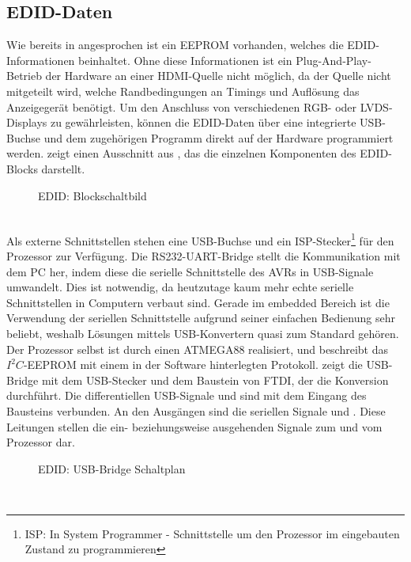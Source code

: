 \subsection{EDID-Daten}
\label{cha:sw_edid_daten}
Wie bereits in  angesprochen ist ein EEPROM vorhanden, welches die EDID-Informationen beinhaltet. Ohne diese Informationen ist ein Plug-And-Play-Betrieb der Hardware an einer HDMI-Quelle nicht möglich, da der Quelle nicht mitgeteilt wird, welche Randbedingungen an Timings und Auflösung das Anzeigegerät benötigt. Um den Anschluss von verschiedenen RGB- oder LVDS-Displays zu gewährleisten, können die EDID-Daten über eine integrierte USB-Buchse und dem zugehörigen Programm direkt auf der Hardware programmiert werden.  zeigt einen Ausschnitt aus , das die einzelnen Komponenten des EDID-Blocks darstellt. 
\begin{figure}[htp]
	\center
    \caption{EDID: Blockschaltbild}
    \label{fig:teilb_edid_blockschaltbild}
\end{figure}\\
Als externe Schnittstellen stehen eine USB-Buchse und ein ISP-Stecker\footnote{ISP: In System Programmer - Schnittstelle um den Prozessor im eingebauten Zustand zu programmieren} für den Prozessor zur Verfügung. Die RS232-UART-Bridge stellt die Kommunikation mit dem PC her, indem diese die serielle Schnittstelle des AVRs in USB-Signale umwandelt. Dies ist notwendig, da heutzutage kaum mehr echte serielle Schnittstellen in Computern verbaut sind. Gerade im embedded Bereich ist die Verwendung der seriellen Schnittstelle aufgrund seiner einfachen Bedienung sehr beliebt, weshalb Lösungen mittels USB-Konvertern quasi zum Standard gehören. Der Prozessor selbst ist durch einen ATMEGA88 realisiert, und beschreibt das $I^2C$-EEPROM mit einem in der Software hinterlegten Protokoll. 
 zeigt die USB-Bridge mit dem USB-Stecker und dem Baustein  von FTDI, der die Konversion durchführt. Die differentiellen USB-Signale  und  sind mit dem Eingang des Bausteins verbunden. An den Ausgängen sind die seriellen Signale  und . Diese Leitungen stellen die ein- beziehungsweise ausgehenden Signale zum und vom Prozessor dar.
\begin{figure}[htp]
	\center
    \caption{EDID: USB-Bridge Schaltplan}
    \label{fig:teilb_edid_usb_sch}
\end{figure}\\
